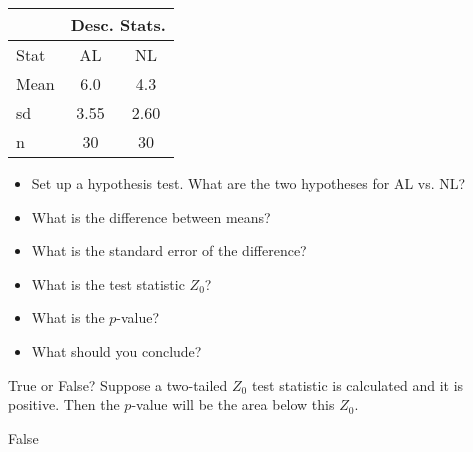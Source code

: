 \documentclass[11pt]{book}\usepackage[]{graphicx}\usepackage[]{color}
\begin{document}
\begin{exercises}
\begin{exercise}
\begin{table}[htbp]
   \centering
   \begin{tabular}{@{} lcc @{}}  \hline%
       & \multicolumn{2}{c}{Desc. Stats.}  \\ \hline
      Stat & AL & NL \\ \hline
      Mean & 6.0 & 4.3 \\
      sd   & 3.55 & 2.60  \\
      n    & 30 & 30 \\ \hline
   \end{tabular}
   \label{tab:tbl13a}
\end{table}

\begin{itemize}
  \item Set up a hypothesis test. What are the two hypotheses for AL vs. NL?
  \item What is the difference between means?
  \item What is the standard error of the difference?
  \item What is the test statistic $Z_0$?
  \item What is the $p$-value?
  \item What should you conclude?
\end{itemize}

\end{exercise}
% 
% 

\begin{exercise} %

True or False? Suppose a two-tailed $Z_0$ test statistic is calculated and it is positive. Then the $p$-value will be the area below this $Z_0$.

\end{exercise}
\begin{solution} %

False

\end{solution}

\begin{exercise} %


\end{exercise}
\end{exercises}
\end{document}
